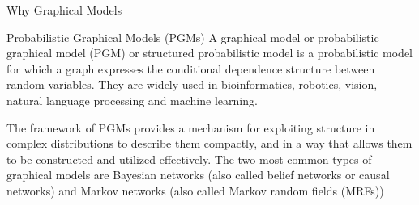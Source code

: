 \documentclass[10pt]{beamer}
\begin{document}
\begin{CJK*}{UTF8}{gbsn}
\begin{frame}{Why Graphical Models}
\end{frame}


\begin{frame}{Probabilistic Graphical Models (PGMs)}
    A graphical model or probabilistic graphical model (PGM) or structured probabilistic model is a probabilistic model for which a graph expresses the conditional dependence structure between random variables. They are widely used in bioinformatics, robotics, vision, natural language processing and machine learning.
     
    The framework of PGMs provides a mechanism for exploiting structure in complex distributions to describe them compactly, and in a way that allows them to be constructed and utilized effectively. The two most common types of graphical models are Bayesian networks (also called belief networks or causal networks) and Markov networks (also called Markov random fields (MRFs))
    
    
\end{frame}


\end{CJK*}
\end{document}
